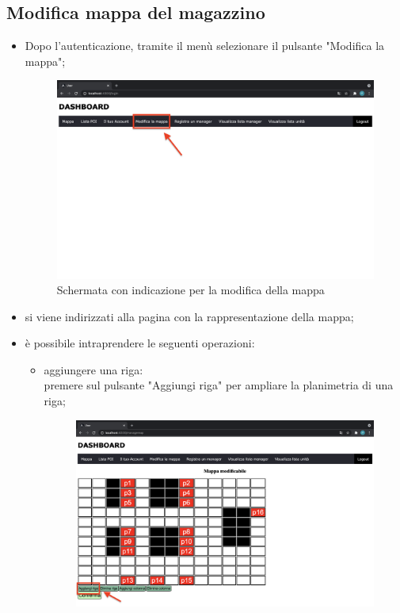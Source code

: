 \subsection{Modifica mappa del magazzino}
\begin{itemize}
    \item Dopo l'autenticazione, tramite il menù selezionare il pulsante "Modifica la mappa";
    \begin{figure}[H]
        \centering
        \includegraphics[scale=0.12]{res/images/dashboard6.png}
        \caption{Schermata con indicazione per la modifica della mappa}
    \end{figure}
    \item si viene indirizzati alla pagina con la rappresentazione della mappa;
    \item è possibile intraprendere le seguenti operazioni:
        \begin{itemize}
            \item aggiungere una riga: \\premere sul pulsante "Aggiungi riga" per ampliare la planimetria di una riga;
            \begin{figure}[H]
                \centering
                \includegraphics[scale=0.12]{res/images/modificamappa1.png}

\end{figure}
\end{itemize}
\end{itemize}
